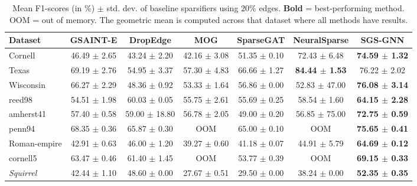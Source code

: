 \begin{table}[t]
\caption{Mean F1-scores (in \%) $\pm$ std. dev. of baseline sparsifiers using $20\%$ edges. \textbf{Bold} = best-performing method. OOM = out of memory.
The geometric mean is computed across that dataset where all methods have results.}
\label{tab:relatedsparse}
\begin{sc}
\resizebox{\columnwidth}{!}
{
\def\arraystretch{1.0}
\begin{tabular}{@{}l|cccccc@{}}
\toprule
\textbf{Dataset} & \textbf{GSAINT-E} & \textbf{DropEdge} & \textbf{MOG} & \textbf{SparseGAT} & \textbf{NeuralSparse} & \textbf{SGS-GNN} \\\midrule
Cornell & 46.49 $\pm$ 2.65 & 43.24 $\pm$ 2.20 & 42.16 $\pm$ 3.08 & 51.35 $\pm$ 0.10 & 72.43 $\pm$ 6.48 & \textbf{74.59 $\pm$ 1.32} \\
Texas & 69.19 $\pm$ 2.76 & 54.95 $\pm$ 3.37 & 57.30 $\pm$ 4.83 & 66.66 $\pm$ 1.27 & \textbf{84.44 $\pm$ 1.53} & 76.22 $\pm$ 2.02 \\
Wisconsin & 66.27 $\pm$ 2.29 & 48.36 $\pm$ 0.92 & 53.33 $\pm$ 1.64 & 56.86 $\pm$ 0.00 & 52.83 $\pm$ 47.00 & \textbf{76.08 $\pm$ 3.14} \\
reed98 & 54.51 $\pm$ 1.98 & 60.03 $\pm$ 0.05 & 55.75 $\pm$ 2.61 & 55.69 $\pm$ 0.25 & 58.54 $\pm$ 1.60 & \textbf{64.15 $\pm$ 2.28} \\
amherst41 & 57.40 $\pm$ 0.58 & 59.00 $\pm$ 18.80 & 56.78 $\pm$ 2.05 & 49.00 $\pm$ 0.20 & 56.85 $\pm$ 75.00 & \textbf{72.75 $\pm$ 0.59} \\
penn94 & 68.35 $\pm$ 0.36 & 65.87 $\pm$ 0.30 & OOM & 65.00 $\pm$ 0.10 & OOM & \textbf{75.65 $\pm$ 0.41} \\
Roman-empire & 42.91 $\pm$ 0.63 & 46.00 $\pm$ 1.20 & 39.27 $\pm$ 0.60 & 41.18 $\pm$ 0.07 & 44.91 $\pm$ 5.79 & \textbf{64.69 $\pm$ 0.12} \\
cornell5 & 63.47 $\pm$ 0.46 & 61.40 $\pm$ 1.45 & OOM & 53.77 $\pm$ 0.39 & OOM & \textbf{69.15 $\pm$ 0.33} \\
\textit{Squirrel} & 42.44 $\pm$ 1.10 & 48.60 $\pm$ 0.00 & 27.67 $\pm$ 0.51 & 29.50 $\pm$ 0.00 & 38.24 $\pm$ 0.00 & \textbf{52.35 $\pm$ 0.35} \\

\end{tabular}}
\end{sc}
\end{table}
